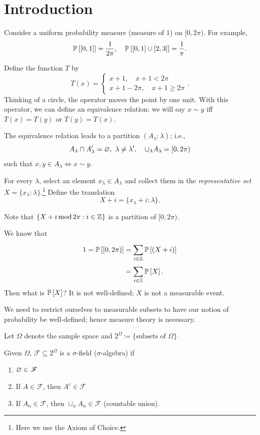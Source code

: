 \section{Introduction}

\begin{example}
	Consider a uniform probability measure (measure of $1$) on $[0,2\pi)$. For example, \[
		\P\left[[0,1]\right] = \frac{1}{2\pi}, \quad \P\left[[0,1] \cup [2,3]\right] = \frac{1}{\pi}
	.\] 

	Define the function $T$ by \[
		T(x) = \begin{cases}
			x+1, \quad x+1 < 2\pi \\
			x+1 - 2\pi, \quad x+1 \ge 2\pi
		\end{cases}
	.\] 
	Thinking of a circle, the operator moves the point by one unit. With this operator, we can define an equivalence relation: we will say $x \sim y$ iff $T(x) = T(y)$ or $T(y) = T(x)$.

	The equivalence relation leads to a partition $(A_\lambda:\lambda)$; i.e., \[
		A_\lambda \cap A_\lambda' = \O, \ \lambda \ne \lambda', \quad \cup_\lambda A_\lambda = [0,2\pi)
	\] such that $x,y \in A_\lambda \iff x \sim y$.

	For every $\lambda$, select an element $x_\lambda \in A_\lambda$ and collect them in the \emph{representative set} $X = \{x_\lambda : \lambda\}$.\footnote{Here we use the Axiom of Choice.} Define the translation \[
		X+i = \{x_\lambda + i : \lambda\}
	.\] 

	Note that $\{X+i \operatorname{mod} 2\pi: i \in \Z\}$ is a partition of $[0,2\pi)$. 

	We know that
	\begin{align*}
		1 = \P\left[[0,2\pi)\right] &= \sum\limits_{i \in \Z}^{} \P\left[(X+i)\right]  \\
									&= \sum\limits_{i \in \Z}^{} \P\left[X\right]
	.\end{align*}
	Then what is $\P\left[X\right]$? It is not well-defined; $X$ is not a measurable event.
\end{example}

We need to restrict ourselves to measurable subsets to have our notion of probability be well-defined; hence measure theory is necessary.

\begin{definition}
	Let $\Omega$ denote the sample space and $2^{\Omega} \coloneqq \{\text{subsets of } \Omega\}$.

	Given $\Omega$, $\mathscr{F} \subseteq 2^{\Omega}$ is a $\sigma$-field ($\sigma$-algebra) if
	\begin{enumerate}[label=(\roman*)]
		\item $\O \in \mathscr{F}$
		\item If $A \in \mathscr{F}$, then $A^{c} \in \mathscr{F}$
		\item If $A_n \in \mathscr{F}$, then $\cup_n A_n \in \mathscr{F}$ (countable union).
	\end{enumerate}
\end{definition}

